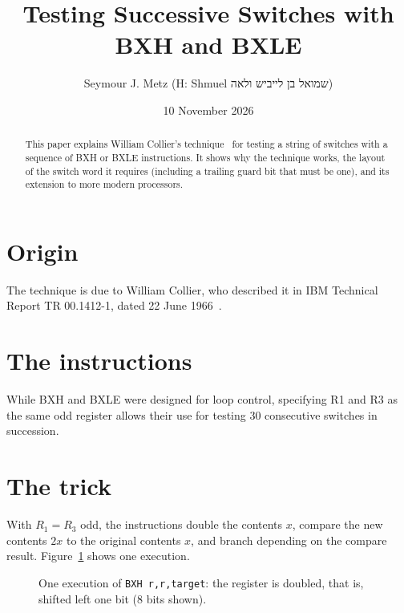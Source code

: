 \documentclass[11pt]{article}
\title{Testing Successive Switches with BXH and BXLE}
\author{Seymour J. Metz (H: Shmuel \texthebrew{שמואל בן לייביש ולאה})}
\date{10 November 2026}
\newcommand{\cell}[4]{%
  \node[draw, minimum width=7mm, minimum height=7mm, fill=#4,
        font=\ttfamily\small] at (#1,#2) {#3};}
\begin{document}
\maketitle

\begin{abstract}
This paper explains William Collier's technique~\cite{collier1966} for
testing a string of switches with a sequence of BXH or BXLE instructions. It
shows why the technique works, the layout of the switch word it requires
(including a trailing guard bit that must be one), and its extension to
more modern processors.
\end{abstract}

\section{Origin}

The technique is due to William Collier, who described it in IBM Technical
Report TR 00.1412-1, dated 22 June 1966~\cite{collier1966}.

\section{The instructions}

While BXH and BXLE were designed for loop control, specifying R1 and R3 as
the same odd register allows their use for testing 30 consecutive switches in
succession.

\section{The trick}

With $R_1 = R_3$ odd, the instructions double the contents $x$, compare the
new contents $2x$ to the original contents $x$, and branch depending on the
compare result. Figure~\ref{fig:one} shows one execution.

\begin{figure}[ht]
\centering
{}
\caption{One execution of \texttt{BXH r,r,target}: the register is doubled,
that is, shifted left one bit (8 bits shown).}
\label{fig:one}
\end{figure}
\end{document}
